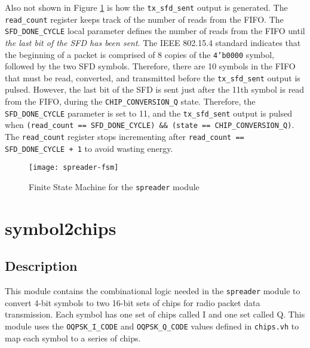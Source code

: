 Also not shown in Figure \ref{fig:spreader-fsm} is how the \texttt{tx\_sfd\_sent} output is generated. The \texttt{read\_count} register keeps track of the number of reads from the FIFO. The \texttt{SFD\_DONE\_CYCLE} local parameter defines the number of reads from the FIFO until \textit{the last bit of the SFD has been sent}. The IEEE 802.15.4 standard \cite{15-4-standard} indicates that the beginning of a packet is comprised of 8 copies of the \texttt{4'b0000} symbol, followed by the two SFD symbols. Therefore, there are 10 symbols in the FIFO that must be read, converted, and transmitted before the \texttt{tx\_sfd\_sent} output is pulsed. However, the last bit of the SFD is sent just after the 11th symbol is read from the FIFO, during the \texttt{CHIP\_CONVERSION\_Q} state. Therefore, the \texttt{SFD\_DONE\_CYCLE} parameter is set to 11, and the \texttt{tx\_sfd\_sent} output is pulsed when \texttt{(read\_count == SFD\_DONE\_CYCLE) \&\& (state == CHIP\_CONVERSION\_Q)}. The \texttt{read\_count} register stops incrementing after \texttt{read\_count == SFD\_DONE\_CYCLE + 1} to avoid wasting energy.

\begin{figure}
\centering
\texttt{[image: spreader-fsm]}
\caption{Finite State Machine for the \texttt{spreader} module}
\label{fig:spreader-fsm}
\end{figure}

\section{symbol2chips} \label{symbol2chips}
\subsection{Description}
This module contains the combinational logic needed in the \texttt{spreader} module to convert 4-bit symbols to two 16-bit sets of chips for radio packet data transmission. Each symbol has one set of chips called I and one set called Q. This module uses the \texttt{OQPSK\_I\_CODE} and \texttt{OQPSK\_Q\_CODE} values defined in \texttt{chips.vh} to map each symbol to a series of chips.

